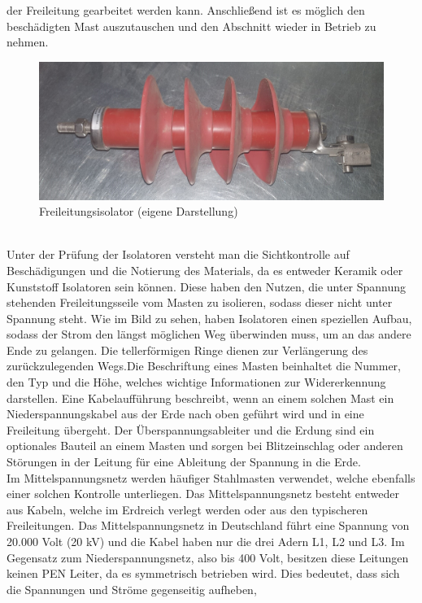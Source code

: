 der Freileitung gearbeitet werden kann. Anschließend ist es möglich den beschädigten Mast auszutauschen und den Abschnitt wieder in Betrieb zu nehmen. 
\begin{figure}[hbt]
    \centering
    \includegraphics[width=0.98\linewidth]{images/Isolator}
    \caption[Isolator]{Freileitungsisolator (eigene Darstellung)}
    \label{fig:Isolator}
\end{figure}
\\Unter der Prüfung der Isolatoren versteht man die Sichtkontrolle auf Beschädigungen und die Notierung des Materials, da es entweder Keramik oder Kunststoff 
Isolatoren sein können. Diese haben den Nutzen, die unter Spannung stehenden Freileitungsseile vom Masten zu isolieren, sodass dieser nicht unter Spannung 
steht. Wie im Bild zu sehen, haben Isolatoren einen speziellen Aufbau, sodass der Strom den längst möglichen Weg überwinden muss, um an das andere Ende zu 
gelangen. Die tellerförmigen Ringe dienen zur Verlängerung des zurückzulegenden Wegs.Die Beschriftung eines Masten beinhaltet die Nummer, den Typ und die 
Höhe, welches wichtige Informationen zur Widererkennung darstellen. Eine Kabelaufführung beschreibt, wenn an einem solchen Mast ein Niederspannungskabel 
aus der Erde nach oben geführt wird und in eine Freileitung übergeht. Der Überspannungsableiter und die Erdung sind ein optionales Bauteil an einem Masten 
und sorgen bei Blitzeinschlag oder anderen Störungen in der Leitung für eine Ableitung der Spannung in die Erde.
\\
Im Mittelspannungsnetz werden häufiger Stahlmasten verwendet, welche ebenfalls einer solchen Kontrolle unterliegen. Das Mittelspannungsnetz besteht entweder aus Kabeln, 
welche im Erdreich verlegt werden oder aus den typischeren Freileitungen. Das Mittelspannungsnetz in Deutschland führt eine Spannung von 20.000 Volt (20 kV) 
und die Kabel haben nur die drei Adern L1, L2 und L3. Im Gegensatz zum Niederspannungsnetz, also bis 400 Volt, besitzen diese Leitungen keinen PEN Leiter, da 
es symmetrisch betrieben wird. Dies bedeutet, dass sich die Spannungen und Ströme gegenseitig aufheben, 
